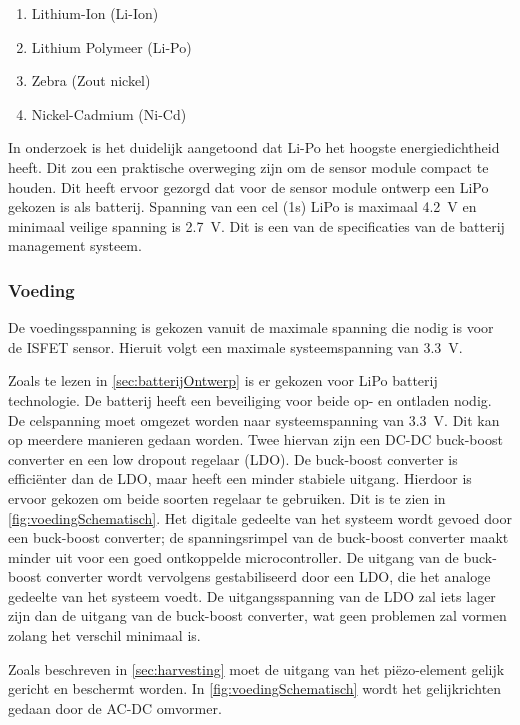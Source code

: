 \begin{enumerate}
    \item Lithium-Ion (Li-Ion)
    \item Lithium Polymeer (Li-Po)
    \item Zebra (Zout nickel)
    \item Nickel-Cadmium (Ni-Cd)
\end{enumerate}

In onderzoek \cite{battery-comparison} is het duidelijk aangetoond dat Li-Po het hoogste energiedichtheid heeft. Dit zou een praktische overweging zijn om de sensor module compact te houden. Dit heeft ervoor gezorgd dat voor de sensor module ontwerp een LiPo gekozen is als batterij. Spanning van een cel (1s) LiPo is maximaal \qty{4.2}{\volt} en minimaal veilige spanning is \qty{2.7}{\volt}\cite{BatteryComparison}. Dit is een van de specificaties van de batterij management systeem.


\subsubsection{Voeding} \label{sec:voeding}
De voedingsspanning is gekozen vanuit de maximale spanning die nodig is voor de ISFET sensor\cite{isfet}. Hieruit volgt een maximale systeemspanning van \qty{3.3}{\volt}.

Zoals te lezen in \cref{sec:batterijOntwerp} is er gekozen voor LiPo batterij technologie. De batterij heeft een beveiliging voor beide op- en ontladen nodig. De celspanning moet omgezet worden naar systeemspanning van \qty{3.3}{\volt}. Dit kan op meerdere manieren gedaan worden. Twee hiervan zijn een DC-DC buck-boost converter en een low dropout regelaar (LDO). De buck-boost converter is efficiënter dan de LDO, maar heeft een minder stabiele uitgang. Hierdoor is ervoor gekozen om beide soorten regelaar te gebruiken. Dit is te zien in \cref{fig:voedingSchematisch}. Het digitale gedeelte van het systeem wordt gevoed door een buck-boost converter; de spanningsrimpel van de buck-boost converter maakt minder uit voor een goed ontkoppelde microcontroller.
De uitgang van de buck-boost converter wordt vervolgens gestabiliseerd door een LDO, die het analoge gedeelte van het systeem voedt. De uitgangsspanning van de LDO zal iets lager zijn dan de uitgang van de buck-boost converter, wat geen problemen zal vormen zolang het verschil minimaal is.

Zoals beschreven in \cref{sec:harvesting} moet de uitgang van het piëzo-element gelijk gericht en beschermt worden. In \cref{fig:voedingSchematisch} wordt het gelijkrichten gedaan door de AC-DC omvormer.

